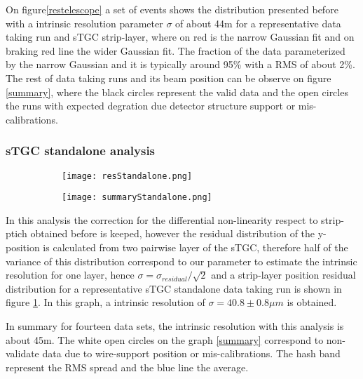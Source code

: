 On figure\ref{restelescope} a set of events shows the distribution presented before with a intrinsic resolution
parameter $\sigma$ of about
\unit{44}{\micro m} for a representative data taking run and sTGC strip-layer, where on red is the narrow Gaussian fit
and on braking red line the wider Gaussian fit. The fraction of the data parameterized by the narrow Gaussian and it is
typically around 95\% with a RMS of about 2\%. The rest of data taking runs and its beam position can be observe on
figure \ref{summary}, where the black circles represent the valid data and the open circles the runs with expected
degration due detector structure support or mis-calibrations.\par






\subsubsection{sTGC standalone analysis}
\begin{figure}[ht]
\centering
\begin{subfigure}[b]{0.45\textwidth}
\centering
\texttt{[image: resStandalone.png]}
\caption{}\label{pairwise}
\end{subfigure}
\begin{subfigure}[b]{0.45\textwidth}
\centering
\texttt{[image: summaryStandalone.png]}
\caption{}\label{}
\end{subfigure}
\end{figure}

In this analysis the correction for the differential non-linearity respect to strip-ptich obtained before is keeped,
however the residual distribution of the y-position is calculated from two pairwise layer of the sTGC, therefore half of
the variance of this distribution correspond to our parameter to estimate the intrinsic resolution for one layer, hence
$\sigma = \sigma_{residual}/\sqrt{2}$ and a strip-layer position residual distribution for a representative sTGC
standalone data taking run is shown in figure \ref{pairwise}. In this graph, a intrinsic resolution of $\sigma=40.8\pm0.8\mu m$ is obtained.\par 
In summary for fourteen data sets, the intrinsic resolution with this analysis is about \unit{45}{\micro m}. The white open
circles on the graph \ref{summary} correspond to non-validate data due to wire-support position or mis-calibrations. The
hash band represent the RMS spread and the blue line the average.\par 



